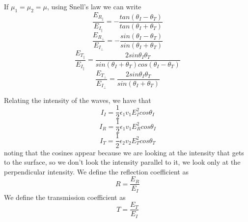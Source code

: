 \documentclass[oneside, 10pt, notitlepage]{book}
\begin{document}
If \(\mu_1 = \mu_2 = \mu\), using Snell's law we can write
\begin{equation} 
    \frac{E_{R_{\parallel}}}{E_{I_{\parallel}}} = -\frac{tan(\theta_I - \theta_T)}{tan(\theta_I + \theta_T)}
\end{equation}
\begin{equation} 
    \frac{E_{R_{\perp}}}{E_{I_{\perp}}} = -\frac{sin(\theta_I - \theta_T)}{sin(\theta_I + \theta_T)}
\end{equation}
\begin{equation} 
    \frac{E_{T_{\parallel}}}{E_{I_{\parallel}}} = \frac{2sin\theta_I\theta_T}{sin(\theta_I + \theta_T)cos(\theta_I - \theta_T)}
\end{equation}
\begin{equation} 
    \frac{E_{T_{\perp}}}{E_{I_{\perp}}} = \frac{2sin\theta_I\theta_T}{sin(\theta_I + \theta_T)}
\end{equation}

Relating the intensity of the waves, we have that
\begin{equation} 
    I_I = \frac{1}{2}\epsilon_1 v_1 E_I^2 cos\theta_I
\end{equation}
\begin{equation} 
    I_R = \frac{1}{2}\epsilon_1 v_1 E_R^2 cos\theta_I
\end{equation}
\begin{equation} 
    I_T = \frac{1}{2}\epsilon_2 v_2 E_T^2 cos\theta_T
\end{equation}
noting that the cosines appear because we are looking at the intensity that gets to the surface, so we don't look the intensity parallel to it, we look only at the perpendicular intensity.
We define the reflection coefficient as
\begin{equation}
    R = \frac{E_R}{E_I}
\end{equation}
We define the transmission coefficient as
\begin{equation}
    T = \frac{E_T}{E_I}
\end{equation}














\end{document}
